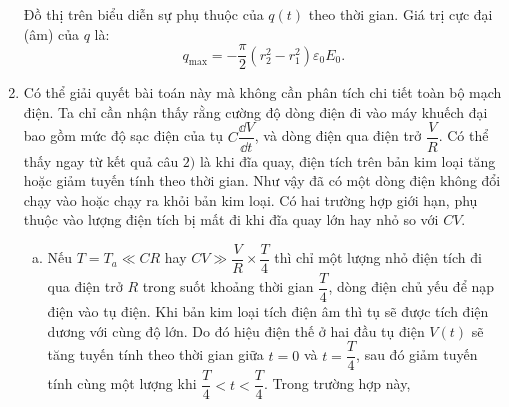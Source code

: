 \begin{loigiai}
\begin{enumerate}[1)]
\begin{center}
    \end{center}
    Đồ thị trên biểu diễn sự phụ thuộc của $q(t)$ theo thời gian. Giá trị cực đại (âm) của $q$ là:
    \[q_{\max} = -\dfrac{\pi}{2}(r_2^2 - r_1^2)\varepsilon_0E_0. \]
    \item Có thể giải quyết bài toán này mà không cần phân tích chi tiết toàn bộ mạch điện. Ta chỉ cần nhận thấy rằng cường độ dòng điện đi vào máy khuếch đại bao gồm mức độ sạc điện của tụ $C \dfrac{\dd V}{\dd t}$, và dòng điện qua điện trở $\dfrac{V}{R}$. Có thể thấy ngay từ kết quả câu $2)$ là khi đĩa quay, điện tích trên bản kim loại tăng hoặc giảm tuyến tính theo thời gian. Như vậy đã có một dòng điện không đổi chạy vào hoặc chạy ra khỏi bản kim loại. Có hai trường hợp giới hạn, phụ thuộc vào lượng điện tích bị mất đi khi đĩa quay lớn hay nhỏ so với $CV$.
    \begin{enumerate}[a)]
        \item  Nếu $T = T_a \ll CR$ hay $CV \gg \dfrac{V}{R} \times \dfrac{T}{4}$ thì chỉ một lượng nhỏ điện tích đi qua điện trở $R$ trong suốt khoảng thời gian $\dfrac{T}{4}$, dòng điện chủ yếu để nạp điện vào tụ điện.  Khi bản kim loại tích điện âm thì tụ sẽ được tích điện dương với cùng độ lớn. Do đó hiệu điện thế ở hai đầu tụ điện $V(t)$ sẽ tăng tuyến tính theo thời gian giữa $t = 0$ và $t = \dfrac{T}{4}$, sau đó giảm tuyến tính cùng một lượng khi $\dfrac{T}{4} < t < \dfrac{T}{4}$. Trong trường hợp này,
        \begin{center}
            


\begin{tikzpicture}[x=0.75pt,y=0.75pt,yscale=-1,xscale=1]


\end{tikzpicture}
\end{center}
\end{enumerate}
\end{enumerate}
\end{loigiai}
